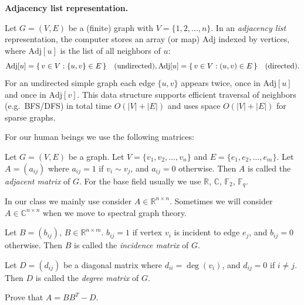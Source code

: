 \documentclass[11pt, a4paper]{ctexrep}
\begin{document}
\textbf{Adjacency list representation.}

Let $G=(V,E)$ be a (finite) graph with $V=\{1,2,\dots,n\}$.  In an \emph{adjacency list} representation, the computer stores an array (or map) $\mathrm{Adj}$ indexed by vertices, where $\mathrm{Adj}[u]$ is the list of all neighbors of $u$:
\[
    \mathrm{Adj}[u]=\{\,v\in V : \{u,v\}\in E\,\}\quad\text{(undirected)}, \\
    \mathrm{Adj}[u]=\{\,v\in V : (u,v)\in E\,\}\quad\text{(directed)}.
\]
For an undirected simple graph each edge $\{u,v\}$ appears twice, once in $\mathrm{Adj}[u]$ and once in $\mathrm{Adj}[v]$.  This data structure supports efficient traversal of neighbors (e.g.\ BFS/DFS) in total time $O(|V|+|E|)$ and uses space $O(|V|+|E|)$ for sparse graphs.

For our human beings we use the following matrices:

\begin{definition}
    Let $ G=(V,E) $ be a graph. Let $V=\{v_1, v_2, \ldots, v_n\}$ and $E=\{e_1, e_2, \ldots, e_m\}$. Let $A=(a_{ij})$ where $a_{ij}=1$ if $v_i \sim v_j$, and $a_{ij}=0$ otherwise. Then $A$ is called the \emph{adjacent matrix} of $G$. For the base field usually we use $\mathbb{R}$, $\mathbb{C}$, $\mathbb{F}_2$, $\mathbb{F}_q$.
\end{definition}

\begin{remark}
    In our class we mainly use consider $ A \in \mathbb{R}^{n \times n} $. Sometimes we will consider $ A \in \mathbb{C}^{n \times n} $ when we move to spectral graph theory.
\end{remark}

\begin{definition}
    Let $ B=(b_{ij}) $, $ B \in \mathbb{R}^{n\times m} $. $ b_{ij} =1 $ if vertex $v_i$ is incident to edge $e_j$, and $b_{ij}=0$ otherwise. Then $B$ is called the \emph{incidence matrix} of $G$.
\end{definition}

\begin{definition}
    Let $ D=(d_{ij}) $ be a diagonal matrix where $ d_{ii} = \deg(v_i) $, and $ d_{ij} = 0 $ if $ i \ne j $. Then $D$ is called the \emph{degree matrix} of $G$.
\end{definition}

\begin{exercise}
    Prove that $A = B B^T - D$.
\end{exercise}
\end{document}
